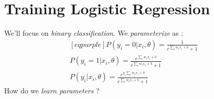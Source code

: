 \documentclass[
	number={4},
	title={Logistic Regression}
]{cs584notes}
\begin{document}
\section{Training Logistic Regression}\label{sec:training-logistic-regression}
We'll focus on \emph{binary classification}.
We \emph{parameterize}  as \data{$\theta$}:
\begin{equation*}
\begin{aligned}[eqpurple]
	P(y_{i} = 0|x_{i},\theta) = \frac{1}{e^{\sum_{i} w_{i}x_{i} + b}+1}\\
	P(y_{i} = 1|x_{i},\theta) = \frac{e^{\sum_{i} w_{i}x_{i} + b}}{e^{\sum_{i} w_{i}x_{i} + b}+1}\\
	P(y_{i}|x_{i},\theta) = \frac{e^{y_{i}\sum_{i} w_{i}x_{i} + b}}{e^{\sum_{i} w_{i}x_{i} + b}+1}
\end{aligned}
\end{equation*}
How do we \emph{learn parameters} \data{$\theta$}?
\end{document}
